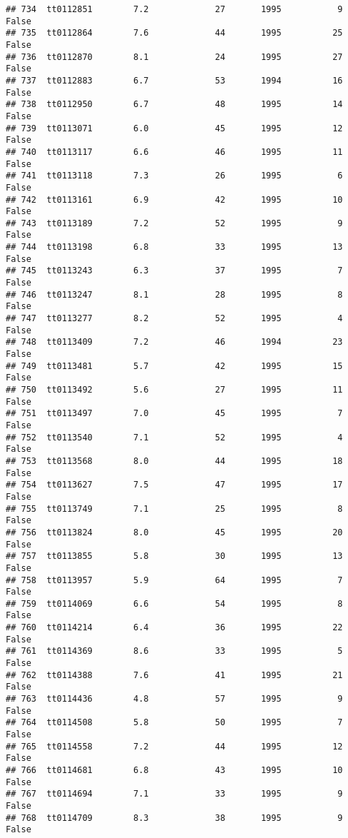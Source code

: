 \documentclass[
]{article}
\begin{document}
\begin{verbatim}
## 734  tt0112851        7.2             27       1995           9   False
## 735  tt0112864        7.6             44       1995          25   False
## 736  tt0112870        8.1             24       1995          27   False
## 737  tt0112883        6.7             53       1994          16   False
## 738  tt0112950        6.7             48       1995          14   False
## 739  tt0113071        6.0             45       1995          12   False
## 740  tt0113117        6.6             46       1995          11   False
## 741  tt0113118        7.3             26       1995           6   False
## 742  tt0113161        6.9             42       1995          10   False
## 743  tt0113189        7.2             52       1995           9   False
## 744  tt0113198        6.8             33       1995          13   False
## 745  tt0113243        6.3             37       1995           7   False
## 746  tt0113247        8.1             28       1995           8   False
## 747  tt0113277        8.2             52       1995           4   False
## 748  tt0113409        7.2             46       1994          23   False
## 749  tt0113481        5.7             42       1995          15   False
## 750  tt0113492        5.6             27       1995          11   False
## 751  tt0113497        7.0             45       1995           7   False
## 752  tt0113540        7.1             52       1995           4   False
## 753  tt0113568        8.0             44       1995          18   False
## 754  tt0113627        7.5             47       1995          17   False
## 755  tt0113749        7.1             25       1995           8   False
## 756  tt0113824        8.0             45       1995          20   False
## 757  tt0113855        5.8             30       1995          13   False
## 758  tt0113957        5.9             64       1995           7   False
## 759  tt0114069        6.6             54       1995           8   False
## 760  tt0114214        6.4             36       1995          22   False
## 761  tt0114369        8.6             33       1995           5   False
## 762  tt0114388        7.6             41       1995          21   False
## 763  tt0114436        4.8             57       1995           9   False
## 764  tt0114508        5.8             50       1995           7   False
## 765  tt0114558        7.2             44       1995          12   False
## 766  tt0114681        6.8             43       1995          10   False
## 767  tt0114694        7.1             33       1995           9   False
## 768  tt0114709        8.3             38       1995           9   False

\end{verbatim}
\end{document}
